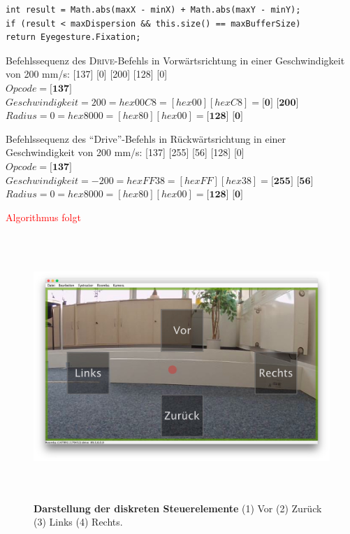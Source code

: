 \begin{lstlisting}
int result = Math.abs(maxX - minX) + Math.abs(maxY - minY);  
if (result < maxDispersion && this.size() == maxBufferSize)
return Eyegesture.Fixation;
\end{lstlisting}

\begin{beispiel}{Befehlssequenz des \textsc{Drive}-Befehls in Vorwärtsrichtung in einer Geschwindigkeit von 200 mm/s: [137] [0] [200] [128] [0]} \\
\(Opcode = \textbf{[137]}\) \\
\(Geschwindigkeit = 200 = hex 00C8 = [hex 00][hex C8] = \textbf{[0] [200]}\) \\
\(Radius= 0 = hex 8000 = [hex 80][hex 00] = \textbf{[128] [0]}\) \\
\label{exa:driveVor}
\end{beispiel}

\begin{beispiel}{Befehlssequenz des \enquote{Drive}-Befehls in Rückwärtsrichtung in einer Geschwindigkeit von 200 mm/s: [137] [255] [56] [128] [0]} \\
\(Opcode = \textbf{[137]}\) \\
\(Geschwindigkeit = -200 = hex FF38 = [hex FF][hex 38] = \textbf{[255] [56]}\) \\
\(Radius= 0 = hex 8000 = [hex 80][hex 00] = \textbf{[128] [0]}\) \\
\label{exa:driveBack}
\end{beispiel}
\textcolor{red}{ Algorithmus folgt}

\begin{figure}[ht]
\begin{center}
\includegraphics[width=\textwidth, height=100mm]{bilder/implementierung/diskretMode.JPG}
\end{center}
\caption{\textbf{Darstellung der diskreten Steuerelemente} (1) Vor (2) Zurück (3)  Links (4) Rechts. }
\label{fig:diskretMode}
\end{figure}

